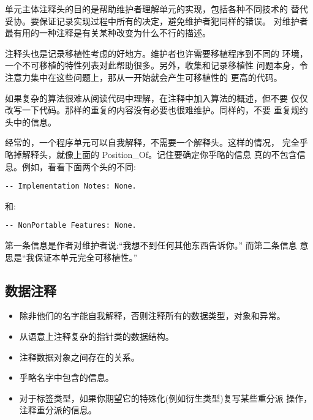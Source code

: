 \begin{blockindent}
单元主体注释头的目的是帮助维护者理解单元的实现，包括各种不同技术的
替代妥协。要保证记录实现过程中所有的决定，避免维护者犯同样的错误。
对维护者最有用的一种注释是有关某种改变为什么不行的描述。

注释头也是记录移植性考虑的好地方。维护者也许需要移植程序到不同的
环境，一个不可移植的特性列表对此帮助很多。另外，收集和记录移植性
问题本身，令注意力集中在这些问题上，那从一开始就会产生可移植性的
更高的代码。

如果复杂的算法很难从阅读代码中理解，在注释中加入算法的概述，但不要
仅仅改写一下代码。那样的重复的内容没有必要也很难维护。同样的，不要
重复规约头中的信息。
\end{blockindent}

\begin{blockindent}
经常的，一个程序单元可以自我解释，不需要一个解释头。这样的情况，
完全乎略掉解释头，就像上面的 Position\_Of。记住要确定你乎略的信息
真的不包含信息。例如，看看下面两个头的不同:
\begin{lstlisting}
-- Implementation Notes: None.
\end{lstlisting}
和:
\begin{lstlisting}
-- NonPortable Features: None.
\end{lstlisting}
第一条信息是作者对维护者说:``我想不到任何其他东西告诉你。'' 而第二条信息
意思是``我保证本单元完全可移植性。''
\end{blockindent}

\subsection{数据注释}
\begin{itemize}
    \item 除非他们的名字能自我解释，否则注释所有的数据类型，对象和异常。
    \item 从语意上注释复杂的指针类的数据结构。
    \item 注释数据对象之间存在的关系。
    \item 乎略名字中包含的信息。
    \item 对于标签类型，如果你期望它的特殊化(例如衍生类型)复写某些重分派
    操作，注释重分派的信息。
\end{itemize}

